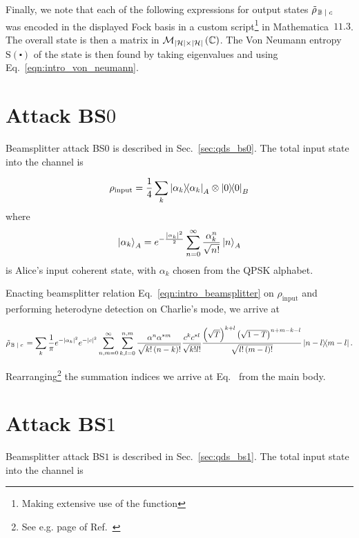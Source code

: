 Finally, we note that each of the following expressions for output states $\tilde{\rho}_{\left. \mathbb{B} \; \middle| \; c\right.}$ was encoded in the displayed Fock basis in a custom script\footnote{Making extensive use of the  function} in Mathematica~$11.3$. The overall state is then a matrix in $\mathcal{M}_{\left|\mathcal{H}\right| \times \left|\mathcal{H}\right|}\left(\mathbb{C}\right)$. The Von Neumann entropy $\text{S}\left(\centerdot\right)$ of the state is then found by taking eigenvalues and using Eq.~\ref{eqn:intro_von_neumann}.

\section{Attack BS$0$}
Beamsplitter attack BS$0$ is described in Sec.~\ref{sec:qds_bs0}. The total input state into the channel is

\begin{equation}
\rho_{\text{input}} = \frac{1}{4}\sum_k \dyad{\alpha_k}_A \otimes \dyad{0}_B
\end{equation}
where
\begin{equation}
\ket{\alpha_k}_A = e^{- \frac{\left| \alpha_k \right|^2}{2}} \sum_{n=0}^\infty \frac{\alpha_k^n}{\sqrt{n!}} \ket{n}_A
\end{equation}
is Alice's input coherent state, with $\alpha_k$ chosen from the QPSK alphabet. 

Enacting beamsplitter relation Eq.~\ref{eqn:intro_beamsplitter} on $\rho_{\text{input}}$ and performing heterodyne detection on Charlie's mode, we arrive at 

\begin{equation}
\tilde{\rho}_{\left. \mathbb{B} \given c \right.} = \sum_k \frac{1}{\pi} e^{-\left|\alpha_k\right|^2}  e^{-\left|c\right|^2} \sum_{n, m = 0}^\infty \sum_{k, l = 0}^{n, m} \frac{\alpha^n \alpha^{* m}}{\sqrt{k! \left(n - k\right)!}} \frac{c^k c^{* l}}{\sqrt{k! l!}} \frac{\left(\sqrt{T}\right)^{k+l} \left(\sqrt{1-T}\right)^{n + m - k - l}}{\sqrt{l! \left(m-l\right)!}} \dyad{n-l}{m-l}.
\end{equation}

\noindent Rearranging\footnote{See e.g. page  of Ref.~\cite{GerryandKnight}} the summation indices we arrive at Eq.~ from the main body.

\section{Attack BS$1$}\label{appendix:bs1}
Beamsplitter attack BS$1$ is described in Sec.~\ref{sec:qds_bs1}. The total input state into the channel is 

